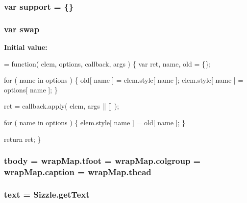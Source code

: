 \subsubsection[{\texorpdfstring{support}{support}}]{\setlength{\rightskip}{0pt plus 5cm}var support = \{\}}\hypertarget{jquery-3_82_81_8js_ab166c89ccabddfd7c423a7fcb23ca84f}{}\label{jquery-3_82_81_8js_ab166c89ccabddfd7c423a7fcb23ca84f}
\subsubsection[{\texorpdfstring{swap}{swap}}]{\setlength{\rightskip}{0pt plus 5cm}var swap}\hypertarget{jquery-3_82_81_8js_a1d3525b85ad04398fea4a9eed16e2783}{}\label{jquery-3_82_81_8js_a1d3525b85ad04398fea4a9eed16e2783}
{\bfseries Initial value\+:}
\begin{DoxyCode}
= \textcolor{keyword}{function}( elem, options, callback, args ) \{
    var ret, name,
        old = \{\};

    
    \textcolor{keywordflow}{for} ( name in options ) \{
        old[ name ] = elem.style[ name ];
        elem.style[ name ] = options[ name ];
    \}

    ret = callback.apply( elem, args || [] );

    
    \textcolor{keywordflow}{for} ( name in options ) \{
        elem.style[ name ] = old[ name ];
    \}

    \textcolor{keywordflow}{return} ret;
\}
\end{DoxyCode}
\subsubsection[{\texorpdfstring{tbody}{tbody}}]{ tbody = wrap\+Map.\+tfoot = wrap\+Map.\+colgroup = wrap\+Map.\+caption = wrap\+Map.\+thead}\hypertarget{jquery-3_82_81_8js_ae7180a004e8ddc434ea857b499b3256d}{}\label{jquery-3_82_81_8js_ae7180a004e8ddc434ea857b499b3256d}
\subsubsection[{\texorpdfstring{text}{text}}]{ text = Sizzle.\+get\+Text}\hypertarget{jquery-3_82_81_8js_a95b91e2a7e965b381c9e803999f9d290}{}\label{jquery-3_82_81_8js_a95b91e2a7e965b381c9e803999f9d290}
